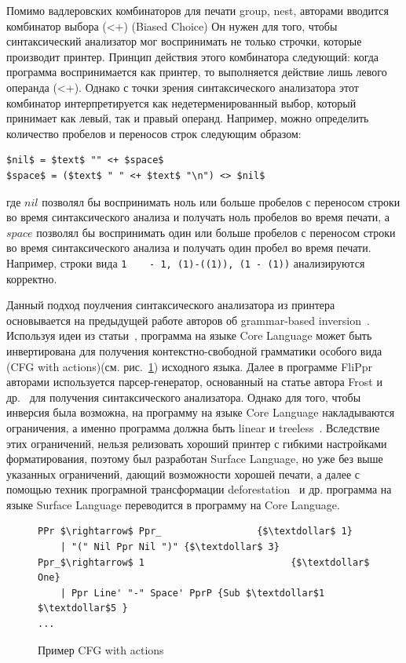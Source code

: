 \documentclass{matmex-diploma-custom}
\begin{document}
Помимо вадлеровских комбинаторов для печати group, nest, авторами вводится комбинатор выбора (<+) (Biased Choice)
Он нужен для того, чтобы синтаксический анализатор мог воспринимать не только строчки, которые производит принтер. Принцип действия этого комбинатора следующий: когда программа воспринимается как принтер, то выполняется действие лишь левого операнда (<+). Однако с точки зрения синтаксического анализатора этот комбинатор интерпретируется как недетерменированный выбор, который принимает как левый, так и правый операнд. Например, можно определить количество пробелов и переносов строк следующим образом:
\begin{lstlisting}[mathescape]
$nil$ = $text$ "" <+ $space$
$space$ = ($text$ " " <+ $text$ "\n") <> $nil$
\end{lstlisting}
где $nil$ позволял бы воспринимать ноль или больше пробелов с переносом строки во время синтаксического анализа и получать ноль пробелов во время печати, а  $space$ позволял бы воспринимать один или больше пробелов с переносом строки во время синтаксического анализа и получать один пробел во время печати. Например, строки вида \lstinline{1    - 1, (1)-((1)), (1 - (1))} анализируются корректно.

Данный подход поулчения синтаксического анализатора из принтера основывается на предыдущей работе авторов об grammar-based inversion~\cite{MatsudaPrew}. Используя идеи из статьи~\cite{MatsudaPrew}, программа на языке Core Language может быть инвертирована для получения контекстно-свободной грамматики особого вида (CFG with actions)(см. рис.~\ref{Пример_CFGAct}) исходного языка. Далее в программе FliPpr авторами используется парсер-генератор, основанный на статье автора Frost и др.~\cite{Frost} для получения синтаксического анализатора. Однако для того, чтобы инверсия была возможна, на программу на языке Core Language накладываются ограничения, а именно программа должна быть linear и treeless~\cite{WadlerDeforest}. Вследствие этих ограничений, нельзя релизовать хороший принтер с гибкими настройками форматирования, поэтому был разработан Surface Language, но уже без выше указанных ограничений, дающий возможности хорошей печати, а далее с помощью техник програмной трансформации deforestation~\cite{WadlerDeforest} и др. программа на языке Surface Language переводится в программу на Core Language.


\begin{figure}[h]
\centering
\begin{lstlisting}[mathescape]
PPr $\rightarrow$ Ppr_                 {$\textdollar$ 1}
    | "(" Nil Ppr Nil ")" {$\textdollar$ 3} 
Ppr_$\rightarrow$ 1                          {$\textdollar$ One}
    | Ppr Line' "-" Space' PprP {Sub $\textdollar$1 $\textdollar$5 }
...    
\end{lstlisting}
\caption{Пример CFG with actions}
\label{Пример_CFGAct}
\end{figure}
\end{document}
